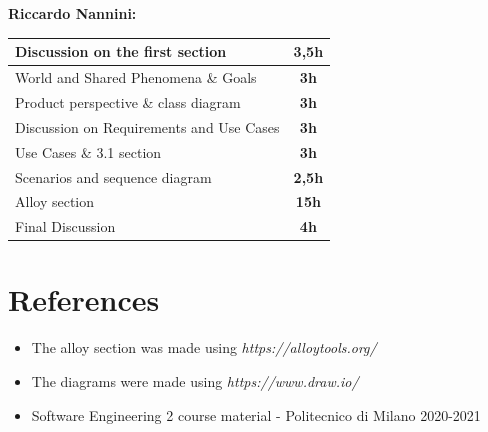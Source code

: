 \documentclass[]{article}
\begin{document}
	\textbf{\large \\ \\ Riccardo Nannini:} \\ \newline
		\begin{tabular}{|l|c|}
			\hline
			\begin{minipage}[t]{8cm}
			Discussion on the first section
			\end{minipage}
			 & 
			\textbf{3,5h} 
			\\ \hline
			\rowcolor[HTML]{DCDCDC} 
			World and Shared Phenomena \& Goals & \textbf{3h} \\ \hline
			Product perspective \& class diagram & \textbf{3h} \\ \hline
			\rowcolor[HTML]{DCDCDC} 
			Discussion on Requirements and Use Cases & \textbf{3h} \\ \hline
			Use Cases \& 3.1 section & \textbf{3h} \\ \hline
			\rowcolor[HTML]{DCDCDC} 
			Scenarios and sequence diagram & \textbf{2,5h} \\ \hline
			Alloy section & \textbf{15h} \\ \hline
			\rowcolor[HTML]{DCDCDC}
			Final Discussion & \textbf{4h} \\ \hline
		\end{tabular}
	
	\bigskip\bigskip
	\section{References}	
	\begin{itemize}
		\item The alloy section was made using \textit{https://alloytools.org/}
		\item The diagrams were made using \textit{https://www.draw.io/}
		\item Software Engineering 2 course material - Politecnico di Milano 2020-2021
	\end{itemize}
				
\end{document}
